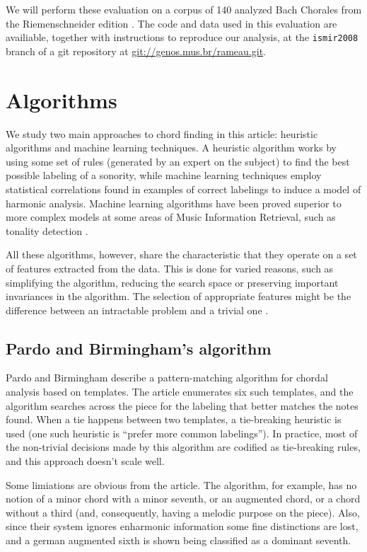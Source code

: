 \documentclass{article}
\begin{document}
We will perform these evaluation on a corpus of 140 analyzed Bach
Chorales from the Riemenschneider edition \cite{bach:371}. The code
and data used in this evaluation are availiable, together with
instructions to reproduce our analysis, at the \texttt{ismir2008}
branch of a git \cite{baudis:git} repository at
\url{git://genos.mus.br/rameau.git}.

\section{Algorithms}
\label{sec:algorithms}


We study two main approaches to chord finding in this article:
heuristic algorithms and machine learning techniques. A heuristic
algorithm works by using some set of rules (generated by an expert on
the subject) to find the best possible labeling of a sonority, while
machine learning techniques employ statistical correlations found in
examples of correct labelings to induce a model of harmonic
analysis. Machine learning algorithms have been proved superior to
more complex models at some areas of Music Information Retrieval, such
as tonality detection \cite{gomez.ea:estimating}.

All these algorithms, however, share the characteristic that they
operate on a set of features extracted from the data. This is done for
varied reasons, such as simplifying the algorithm, reducing the search
space or preserving important invariances in the algorithm. The
selection of appropriate features might be the difference between an
intractable problem and a trivial one \cite{duda.ea:statistical}.


\subsection{Pardo and Birmingham's algorithm}
\label{sec:pardo}


Pardo and Birmingham \cite{pardo.ea:algorithms} describe a
pattern-matching algorithm for chordal analysis based on
templates. The article enumerates six such templates, and the
algorithm searches across the piece for the labeling that better
matches the notes found. When a tie happens between two templates, a
tie-breaking heuristic is used (one such heuristic is ``prefer more
common labelings''). In practice, most of the non-trivial decisions
made by this algorithm are codified as tie-breaking rules, and this
approach doesn't scale well.

Some limiations are obvious from the article. The algorithm, for
example, has no notion of a minor chord with a minor seventh, or an
augmented chord, or a chord without a third (and, consequently, having
a melodic purpose on the piece). Also, since their system ignores
enharmonic information some fine distinctions are lost, and a german
augmented sixth is shown being classified as a dominant seventh.
\end{document}
